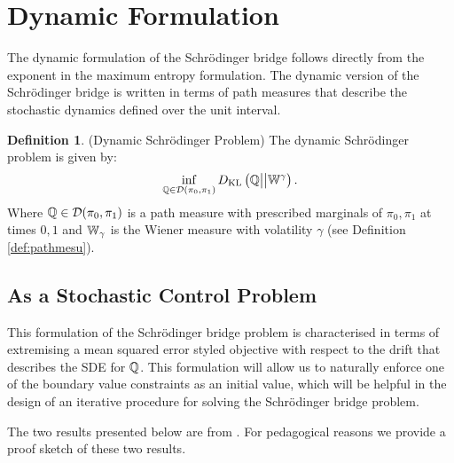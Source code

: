 \documentclass[a4paper,12pt,twoside,openright]{report}
\theoremstyle{definition}
\newtheorem{definition}{Definition}[section]
\begin{document}
\section{Dynamic Formulation}
The dynamic formulation of the Schrödinger bridge follows directly from the exponent in the maximum entropy formulation. The dynamic version of the Schrödinger bridge is written in terms of path measures that describe the stochastic dynamics defined over the unit interval.
\begin{definition}
    (Dynamic Schrödinger Problem) The dynamic Schrödinger problem is given by:
    \begin{align}
        \inf_{{\mathbb{Q}} \in {\mathcal{D}}(\pi_0, \pi_1)} D_{\mathrm{KL}}\left({\mathbb{Q}} \big|\big| \mathbb{W}^{\gamma}\right).
    \end{align}
    Where ${\mathbb{Q}} \in {\mathcal{D}}(\pi_0, \pi_1)$ is a path measure with prescribed marginals of $\pi_0, \pi_1$ at times $0, 1$ and $\mathbb{W}_{\gamma}$ is the Wiener measure with volatility $\gamma$ (see Definition \ref{def:pathmesu}). 
\end{definition}
\subsection{As a Stochastic Control Problem}

This formulation of the Schrödinger bridge problem is characterised in terms of extremising a mean squared error styled objective with respect to the drift that describes the SDE for ${\mathbb{Q}}$. This formulation will allow us to naturally enforce one of the boundary value constraints as an initial value, which will be helpful in the design of an iterative procedure for solving the Schrödinger bridge problem.

The two results presented below are from \cite{pavon1991free}. For pedagogical reasons we provide a proof sketch of these two results.
\end{document}
